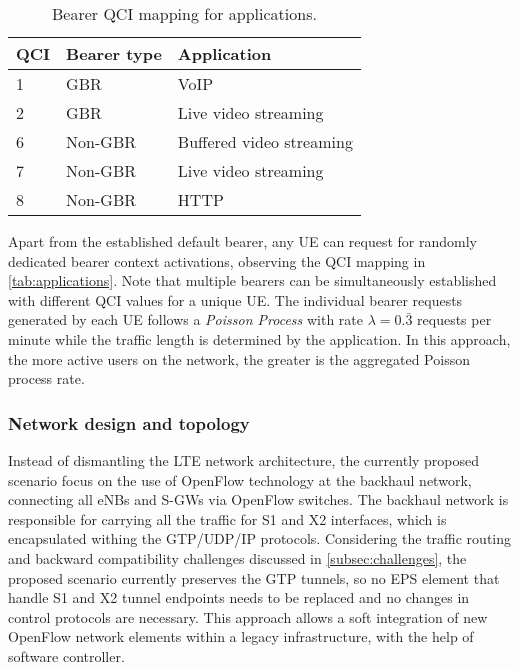 \begin{table}[b!]
  \caption{Bearer \acs{QCI} mapping for applications.}
  \label{tab:applications}
  \centering
  \begin{tabular}{lll}
    \toprule
    \bfseries \acs{QCI} & \bfseries Bearer type & \bfseries Application \\
    \midrule
    1 & \ac{GBR}     & \ac{VoIP} \\
    2 & \ac{GBR}     & Live video streaming \\
    6 & Non-\ac{GBR} & Buffered video streaming \\
    7 & Non-\ac{GBR} & Live video streaming \\
    8 & Non-\ac{GBR} & \ac{HTTP} \\
    \bottomrule
  \end{tabular}
\end{table}

Apart from the established default bearer, any \ac{UE} can request for randomly
dedicated bearer context activations, observing the \ac{QCI} mapping in
\autoref{tab:applications}. Note that multiple bearers can be simultaneously
established with different \ac{QCI} values for a unique \ac{UE}. The individual
bearer requests generated by each \ac{UE} follows a \emph{Poisson Process} with
rate $\lambda = 0.\bar{3}$ requests per minute while the traffic length is
determined by the application. In this approach, the more active users on the
network, the greater is the aggregated Poisson process rate.

\subsubsection{Network design and topology}
\label{subsec:design}

Instead of dismantling the \ac{LTE} network architecture, the currently
proposed scenario focus on the use of OpenFlow technology at the backhaul
network, connecting all \acp{eNB} and \acp{S-GW} via OpenFlow switches. The
backhaul network is responsible for carrying all the traffic for S1 and X2
interfaces, which is encapsulated withing the \ac{GTP}/\ac{UDP}/\ac{IP}
protocols. Considering the traffic routing and backward compatibility
challenges discussed in \autoref{subsec:challenges}, the proposed scenario
currently preserves the \ac{GTP} tunnels, so no \ac{EPS} element that handle S1
and X2 tunnel endpoints needs to be replaced and no changes in control
protocols are necessary. This approach allows a soft integration of new
OpenFlow network elements within a legacy infrastructure, with the help of
software controller.

